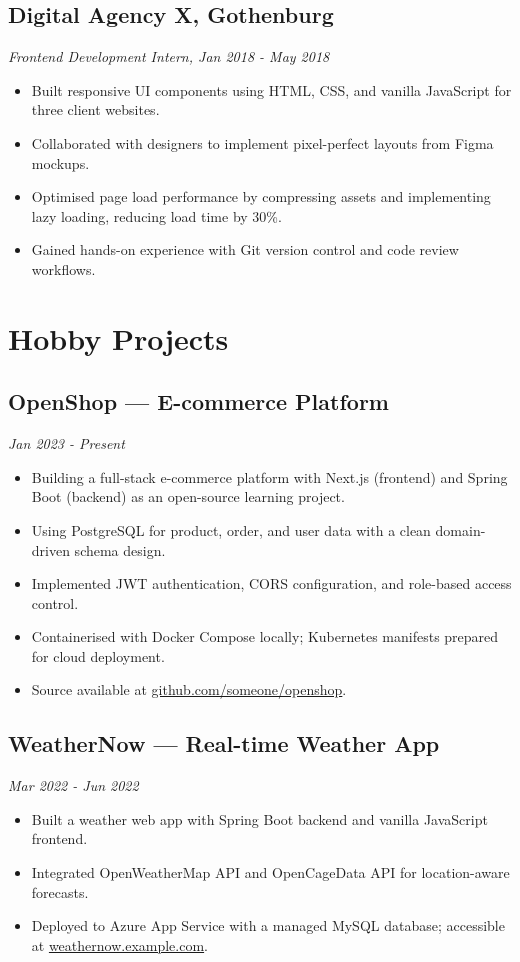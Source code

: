 \documentclass[a4paper,10pt]{article}
\begin{document}
\subsection*{Digital Agency X, Gothenburg}
\textit{Frontend Development Intern, Jan 2018 - May 2018}
\begin{itemize}[noitemsep]
\item Built responsive UI components using HTML, CSS, and vanilla JavaScript for three client websites.
\item Collaborated with designers to implement pixel-perfect layouts from Figma mockups.
\item Optimised page load performance by compressing assets and implementing lazy loading, reducing load time by 30\%.
\item Gained hands-on experience with Git version control and code review workflows.
\end{itemize}

\section*{Hobby Projects}
\subsection*{OpenShop — E-commerce Platform}
\textit{Jan 2023 - Present}
\begin{itemize}[noitemsep]
\item Building a full-stack e-commerce platform with Next.js (frontend) and Spring Boot (backend) as an open-source learning project.
\item Using PostgreSQL for product, order, and user data with a clean domain-driven schema design.
\item Implemented JWT authentication, CORS configuration, and role-based access control.
\item Containerised with Docker Compose locally; Kubernetes manifests prepared for cloud deployment.
\item Source available at \href{https://github.com/someone/openshop}{github.com/someone/openshop}.
\end{itemize}

\subsection*{WeatherNow — Real-time Weather App}
\textit{Mar 2022 - Jun 2022}
\begin{itemize}[noitemsep]
\item Built a weather web app with Spring Boot backend and vanilla JavaScript frontend.
\item Integrated OpenWeatherMap API and OpenCageData API for location-aware forecasts.
\item Deployed to Azure App Service with a managed MySQL database; accessible at \href{https://weathernow.example.com}{weathernow.example.com}.
\end{itemize}
\end{document}
